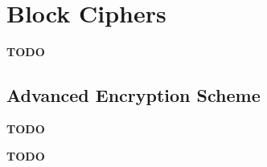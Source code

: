 \section{Block Ciphers}\label{sec:Block_Ciphers}
\begin{definition}\label{def:Block_Cipher}
  \textbf{TODO}
\end{definition}

\subsection{Advanced Encryption Scheme}\label{subsec:AES}
\textbf{TODO}
\begin{definition}\label{def:AES}
  \textbf{TODO}
\end{definition}

